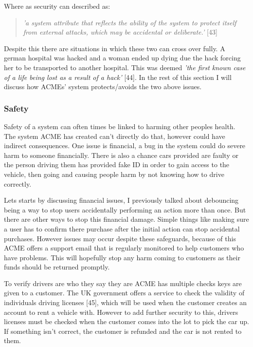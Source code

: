   Where as security can described as:
  \begin{quote}
    \textit{'a system attribute that reflects the ability of the system to protect itself from external attacks, which may be accidental or deliberate.'} [43]
  \end{quote}

  Despite this there are situations in which these two can cross over fully. A german hospital was hacked and a woman ended up dying due the hack forcing her 
  to be transported to another hospital. This was deemed \textit{'the first known case of a life being lost as a result of a hack'} [44].
  In the rest of this section I will discuss how ACMEs' system protects/avoids the two above issues.

  \subsubsection{Safety}
  Safety of a system can often times be linked to harming other peoples health. The system ACME has created can't directly do that, however could have 
  indirect consequences. One issue is financial, a bug in the system could do severe harm to someone financially. There is also a chance cars provided 
  are faulty or the person driving them has provided fake ID in order to gain access to the vehicle, then going and causing people harm by not knowing 
  how to drive correctly.

  Lets starts by discussing financial issues, I previously talked about debouncing being a way to stop users accidentally performing an action more than
  once. But there are other ways to stop this financial damage. Simple things like making sure a user has to confirm there purchase after the initial 
  action can stop accidental purchases. However issues may occur despite these safeguards, because of this ACME offers a support email that is regularly
  monitored to help customers who have problems. This will hopefully stop any harm coming to customers as their funds should be returned promptly.

  To verify drivers are who they say they are ACME has multiple checks keys are given to a customer. The UK government offers a service to check 
  the validity of individuals driving licenses [45], which will be used when the customer creates an account to rent a vehicle with. However to 
  add further security to this, drivers licenses must be checked when the customer comes into the lot to pick the car up. If something isn't correct,
  the customer is refunded and the car is not rented to them.

